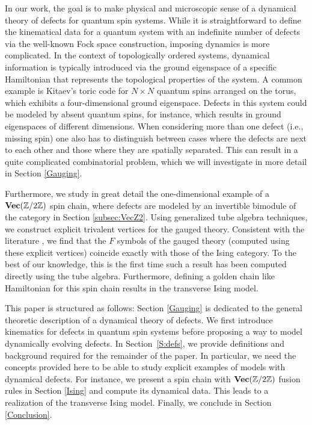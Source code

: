 In our work, the goal is to make physical and microscopic sense of a dynamical theory of defects for quantum spin systems. While it is straightforward to define the kinematical data for a quantum system with an indefinite number of defects via the well-known Fock space construction, imposing dynamics is more complicated. In the context of topologically ordered systems, dynamical information is typically introduced via the ground eigenspace of a specific Hamiltonian that represents the topological properties of the system. A common example is Kitaev's toric code for $N\times N$ quantum spins arranged on the torus, which exhibits a four-dimensional ground eigenspace. Defects in this system could be modeled by absent quantum spins, for instance, which results in ground eigenspaces of different dimensions. When considering more than one defect (i.e., missing spin) one also has to distinguish between cases where the defects are next to each other and those where they are spatially separated. This can result in a quite complicated combinatorial problem, which we will investigate in more detail in Section \ref{Gauging}.

Furthermore, we study in great detail the one-dimensional example of a $\textbf{Vec}(\mathbb{Z}/2\mathbb{Z})$ spin chain, where defects are modeled by an invertible bimodule of the category in Section \ref{subsec:VecZ2}.
Using generalized tube algebra techniques\cite{ocneanu}, we construct explicit trivalent vertices for the gauged theory. Consistent with the literature \cite{TY,ENO10,Bombin2010,BBCW14,WBV17}, we find that the $F$ symbols of the gauged theory (computed using these explicit vertices) coincide exactly with those of the Ising category. To the best of our knowledge, this is the first time such a result has been computed directly using the tube algebra. Furthermore, defining a golden chain like Hamiltonian for this spin chain results in the transverse Ising model.

This paper is structured as follows: Section \ref{Gauging} is dedicated to the general theoretic description of a dynamical theory of defects. We first introduce kinematics for defects in quantum spin systems before proposing a way to model dynamically evolving defects. In Section~\ref{S:defs}, we provide definitions and background required for the remainder of the paper. In particular, we need the concepts provided here to be able to study explicit examples of models with dynamical defects. For instance, we present a spin chain with $\textbf{Vec}(\mathbb{Z}/2\mathbb{Z})$ fusion rules in Section \ref{Ising} and compute its dynamical data. This leads to a realization of the transverse Ising model. Finally, we conclude in Section \ref{Conclusion}.